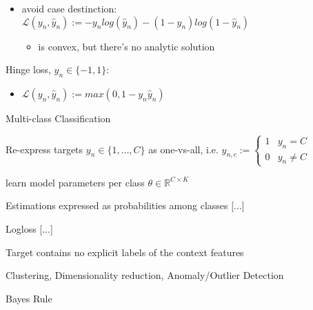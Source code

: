\documentclass[landscape, a4paper]{article}
\begin{document}
\begin{minipage}[t]{0.2\linewidth}
\begin{betterlist}
\begin{betterlist}
\begin{itemize}
					\item \alert{avoid case destinction:}\\ $\mathcal{L}(y_n, \hat y_n) := -y_n log(\hat y_n) - (1 - y_n)log(1-\hat y_n)$
					\begin{itemize}
						\item is \alert{convex}, but there's no analytic solution
					\end{itemize}
				\end{itemize}
				\item \alert{Hinge loss}, $y_n\in\{-1,1\}$:
				\begin{itemize}
					\item $\mathcal{L}(y_n, \hat y_n) := max(0, 1 - y_n\hat y_n)$
				\end{itemize}
			\end{betterlist}
			\item Multi-class Classification
			\begin{betterlist}
				\item Re-express targets $y_n \in \{1, \ldots , C\}$ as one-vs-all, i.e. $y_{n, c} := \begin{cases}
						1 & y_n = C    \\
						0 & y_n \neq C
					\end{cases}$
				\item learn model parameters per class $\theta \in \mathbb{R}^{C\times K}$
				\item Estimations expressed as probabilities among classes [...]
				\item Logloss [...]
			\end{betterlist}
		\end{betterlist}
	\begin{betterlist}
		\item Target contains no explicit labels of the context features
		\item Clustering, Dimensionality reduction, Anomaly/Outlier Detection
	\end{betterlist}
	\begin{betterlist}
		\item Bayes Rule
\end{betterlist}
\end{minipage}
\end{document}
